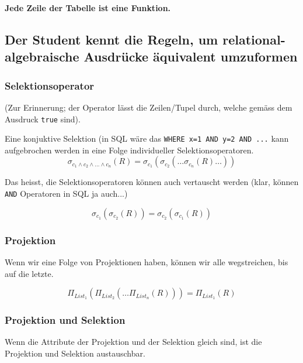 \begin{center}
	\textbf{Jede Zeile der Tabelle ist eine Funktion.}
\end{center}

\subsection{Der Student kennt die Regeln, um relational-algebraische Ausdrücke äquivalent umzuformen}
\label{sec:umformung}

\subsubsection{Selektionsoperator}
(Zur Erinnerung; der Operator lässt die Zeilen/Tupel durch, welche gemäss dem Ausdruck \texttt{true} sind).

Eine konjuktive Selektion (in SQL wäre das \texttt{WHERE x=1 AND y=2 AND ...} kann aufgebrochen werden in eine Folge individueller Selektionsoperatoren.
\begin{equation}\label{konjuktive_selektion}
  \sigma _{c_1\wedge c_2 \wedge \dots \wedge c_n} (R) = \sigma _{c_1} (\sigma _{c_2}(\dots \sigma _{c_n} (R) \dots ))
\end{equation}

Das heisst, die Selektionsoperatoren können auch vertauscht werden (klar, können \texttt{AND} Operatoren in SQL ja auch...)

\begin{equation}
  \sigma _{c_1} (\sigma _{c_2} (R)) =  \sigma _{c_2} (\sigma _{c_1} (R)) 
\end{equation}

\subsubsection{Projektion}
Wenn wir eine Folge von Projektionen haben, können wir alle wegstreichen, bis auf die letzte.

\begin{equation*}
  \Pi _{List_1} ( \Pi _{List_2} ( \dots \Pi _{List_n} (R))) = \Pi _{List_1} (R)
\end{equation*}

\subsubsection{Projektion und Selektion}
Wenn die Attribute der Projektion und der Selektion gleich sind, ist die Projektion und Selektion austauschbar.

